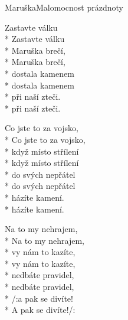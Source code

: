 \documentclass[10.5pt]{book}
\begin{document}
\begin{poem}{Maruška}{Malomocnost prázdnoty}
\begin{altverse}
Zastavte válku\\*
Zastavte válku\\*
Maruška brečí,\\*
Maruška brečí,\\*
dostala kamenem\\*
dostala kamenem\\*
při naší zteči.\\*
při naší zteči.
\end{altverse}

\begin{altverse}
Co jste to za vojsko,\\*
Co jste to za vojsko,\\*
když místo střílení\\*
když místo střílení\\*
do svých nepřátel\\*
do svých nepřátel\\*
házíte kamení.\\*
házíte kamení.
\end{altverse}

\begin{altverse}
Na to my nehrajem,\\*
Na to my nehrajem,\\*
vy nám to kazíte,\\*
vy nám to kazíte,\\*
nedbáte pravidel,\\*
nedbáte pravidel,\\*
/:a pak se divíte!\\*
A pak se divíte!/:
\end{altverse}

\end{poem}
\end{document}
